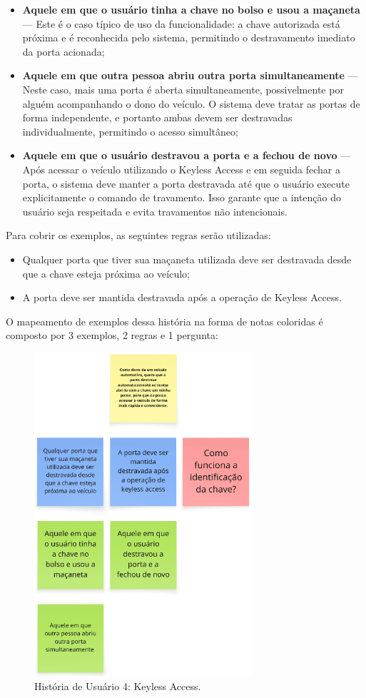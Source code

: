\begin{itemize}
    \item \textbf{Aquele em que o usuário tinha a chave no bolso e usou a maçaneta} — Este é o caso típico de uso da funcionalidade: a chave autorizada está próxima e é reconhecida pelo sistema, permitindo o destravamento imediato da porta acionada;
    \item \textbf{Aquele em que outra pessoa abriu outra porta simultaneamente} — Neste caso, mais uma porta é aberta simultaneamente, possivelmente por alguém acompanhando o dono do veículo. O sistema deve tratar as portas de forma independente, e portanto ambas devem ser destravadas individualmente, permitindo o acesso simultâneo;
    \item \textbf{Aquele em que o usuário destravou a porta e a fechou de novo} — Após acessar o veículo utilizando o Keyless Access e em seguida fechar a porta, o sistema deve manter a porta destravada até que o usuário execute explicitamente o comando de travamento. Isso garante que a intenção do usuário seja respeitada e evita travamentos não intencionais.
\end{itemize}

Para cobrir os exemplos, as seguintes regras serão utilizadas:

\begin{itemize}
    \item Qualquer porta que tiver sua maçaneta utilizada deve ser destravada desde que a chave esteja próxima ao veículo;
    \item A porta deve ser mantida destravada após a operação de Keyless Access.
\end{itemize}

O mapeamento de exemplos dessa história na forma de notas coloridas é composto por 3 exemplos, 2 regras e 1 pergunta:

\begin{figure}[H]
\centering
\includegraphics[height=12cm]{figuras/user_story_4.png}
\caption{História de Usuário 4: Keyless Access.}
\end{figure}

